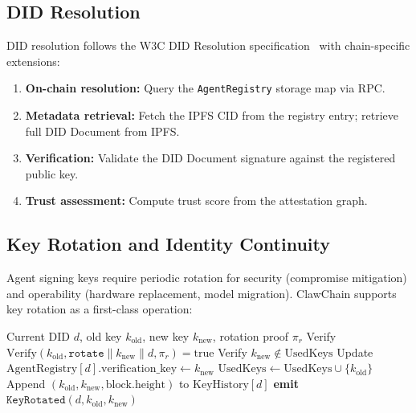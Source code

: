 \documentclass[conference]{IEEEtran}
\begin{document}
\subsection{DID Resolution}

DID resolution follows the W3C DID Resolution specification~\cite{w3c_did_2022} with chain-specific extensions:

\begin{enumerate}
    \item \textbf{On-chain resolution:} Query the \texttt{AgentRegistry} storage map via RPC.
    \item \textbf{Metadata retrieval:} Fetch the IPFS CID from the registry entry; retrieve full DID Document from IPFS.
    \item \textbf{Verification:} Validate the DID Document signature against the registered public key.
    \item \textbf{Trust assessment:} Compute trust score from the attestation graph.
\end{enumerate}

\subsection{Key Rotation and Identity Continuity}

Agent signing keys require periodic rotation for security (compromise mitigation) and operability (hardware replacement, model migration). ClawChain supports key rotation as a first-class operation:

\begin{algorithm}[t]
\caption{Agent Key Rotation Protocol}
\label{alg:keyrotation}
\begin{algorithmic}[1]
\REQUIRE Current DID $d$, old key $k_{\text{old}}$, new key $k_{\text{new}}$, rotation proof $\pi_r$
\STATE Verify $\text{Verify}(k_{\text{old}}, \texttt{rotate} \| k_{\text{new}} \| d, \pi_r) = \text{true}$
\STATE Verify $k_{\text{new}} \notin \text{UsedKeys}$ 
\STATE Update $\text{AgentRegistry}[d].\text{verification\_key} \leftarrow k_{\text{new}}$
\STATE $\text{UsedKeys} \leftarrow \text{UsedKeys} \cup \{k_{\text{old}}\}$ 
\STATE Append $(k_{\text{old}}, k_{\text{new}}, \text{block.height})$ to $\text{KeyHistory}[d]$
\STATE \textbf{emit} $\texttt{KeyRotated}(d, k_{\text{old}}, k_{\text{new}})$
\STATE {}
\RETURN {}
\end{algorithmic}
\end{algorithm}
\end{document}
